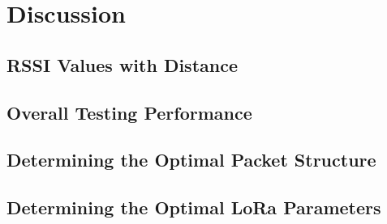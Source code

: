 \documentclass[class=report,11pt,crop=false]{standalone}
\begin{document}
\chapter{Discussion \label{ch:discussion}}

\cite{christian_wolff_physical_2024}

\section{RSSI Values with Distance}

\section{Overall Testing Performance}


\section{Determining the Optimal Packet Structure}\label{sec:optimalpacketstructure}


\section{Determining the Optimal LoRa Parameters}


\ifstandalone

\printnoidxglossary[type=\acronymtype,nonumberlist]
\fi
\end{document}
